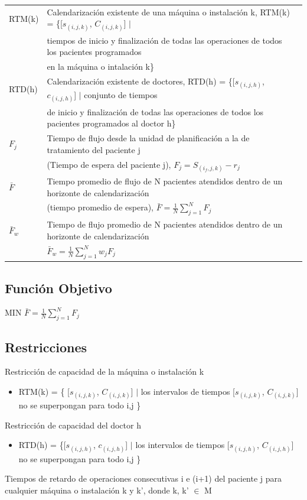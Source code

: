 \documentclass[letter, 10pt]{article}
\begin{document}
\begin{tabular}{llr}
RTM(k) &     Calendarización existente de una máquina o instalación k, RTM(k) = \{[$s_{(i,j,k)}$, $C_{(i,j,k)}$] $\mid$
\\& tiempos de inicio y finalización de todas las operaciones de todos los pacientes programados 
\\& en la máquina o intalación k\} 
\\\hline

RTD(h) &     Calendarización existente de doctores, RTD(h) = \{[$s_{(i,j,h)}$, $c_{(i,j,h)}$] $\mid$ conjunto de tiempos 
\\&de inicio y finalización de todas las operaciones de todos los pacientes programados al doctor h\}

\\\hline
$F_{j}$ &            Tiempo de flujo desde la unidad de planificación a la de tratamiento del paciente j \\&  (Tiempo de espera del paciente j), 
$F_{j} = S_{(i_{f}, j, k)} - r_{j}$
\\\hline
$\bar{F}$  &         Tiempo promedio de flujo de N pacientes atendidos dentro de un horizonte de calendarización
\\& (tiempo promedio de espera),  $\bar{F} = \frac{1}{N}\sum_{j=1}^{N}{F_{j}}$
\\\hline
$\bar{F}_{w}$ &     Tiempo de flujo promedio de N pacientes atendidos dentro de un horizonte de calendarización
\\& $\bar{F}_{w} = \frac{1}{N}\sum_{j=1}^{N}{w_{j}F_{j}}$
\\\hline
\hline
\end{tabular}

\subsection{Función Objetivo}
MIN $\bar{F}= \frac{1}{N}\sum_{j=1}^{N}{F_{j}}$
\subsection{Restricciones}
Restricción de capacidad de la máquina o instalación k\\
\begin{itemize}
    \item  RTM(k) = \{ [$s_{(i,j,k)}$, $C_{(i,j,k)}$] $\mid$ los intervalos de tiempos [$s_{(i,j,k)}$, $C_{(i,j,k)}$] no se superpongan para todo i,j \}
\end{itemize}
Restricción de capacidad del doctor h 
\begin{itemize}
    \item   RTD(h) = \{[$s_{(i,j,h)}$, $c_{(i,j,h)}$] $\mid$ los intervalos de tiempos [$s_{(i,j,h)}$, $C_{(i,j,h)}$] no se superpongan para todo i,j \}
\end{itemize}
Tiempos de retardo de operaciones consecutivas i e (i+1) del paciente j para cualquier máquina o instalación k y k', donde k, k' $\in$ M
\end{document}
